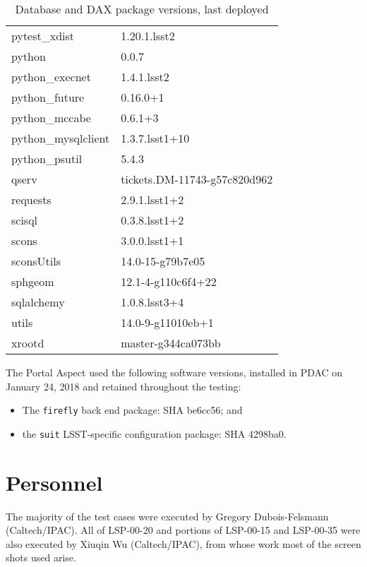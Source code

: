 \documentclass[DM,toc]{lsstdoc}
\begin{document}
\begin{table}[h]
\begin{tabular}{l l}
pytest\_xdist       &   1.20.1.lsst2  \\
python             &   0.0.7       \\
python\_execnet     &   1.4.1.lsst2  \\
python\_future      &   0.16.0+1    \\
python\_mccabe      &   0.6.1+3     \\
python\_mysqlclient &   1.3.7.lsst1+10  \\
python\_psutil      &   5.4.3       \\
qserv              &   tickets.DM-11743-g57c820d962  \\
requests           &   2.9.1.lsst1+2  \\
scisql             &   0.3.8.lsst1+2  \\
scons              &   3.0.0.lsst1+1  \\
sconsUtils         &   14.0-15-g79b7e05  \\
sphgeom            &   12.1-4-g110c6f4+22  \\
sqlalchemy         &   1.0.8.lsst3+4  \\
utils              &   14.0-9-g11010eb+1  \\
xrootd             &   master-g344ca073bb  \\
\end{tabular}
\caption{Database and DAX package versions, last deployed}
\label{tab:dax-versions}
\end{table}


The Portal Aspect used the following software versions, installed in PDAC on January 24, 2018 and retained throughout the testing:

\begin{itemize}
\item{The \verb|firefly| back end package: SHA be6cc56; and}
\item{the \verb|suit| LSST-specific configuration package: SHA 4298ba0.}
\end{itemize}


\section{Personnel}
\label{sect:personnel}

The majority of the test cases were executed by Gregory Dubois-Felsmann (Caltech/IPAC).
All of LSP-00-20 and portions of LSP-00-15 and LSP-00-35 were also executed by Xiuqin Wu (Caltech/IPAC),
from whose work most of the screen shots used arise.
\end{document}
